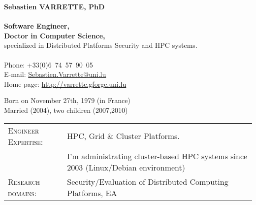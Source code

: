 \documentclass{cv}
\begin{document}
\begin{chapeau}
    \begin{adresse}
        {\Large\textbf{Sebastien VARRETTE, PhD}}\\
        \ligne\\
        \textbf{Software Engineer,}\\
        \textbf{Doctor in Computer Science,}\\
        specialized in Distributed Platforms Security and HPC systems.\\
        \ligne\\
        Phone: +33(0)6~74~57~90~05\\
        E-mail:    \url{Sebastien.Varrette@uni.lu}\\
        Home page: \url{http://varrette.gforge.uni.lu}
    \end{adresse}
    \begin{etatcivil}

        Born on November 27th, 1979 (in France)\\
        Married (2004), two children (2007,2010)\\
    \end{etatcivil}
\end{chapeau}

\vspace{1.6em}
\begin{tabular}{ll}
    \textsc{Engineer Expertise:} & \acf{HPC}, Grid \& Cluster Platforms.
    \\
    & \hfill I'm administrating cluster-based \ac{HPC} systems since 2003
    (Linux/Debian environment)
    \\
    \textsc{Research domains}: & Security/Evaluation of Distributed
    Computing Platforms, \acf{EA}
\end{tabular}












\end{document}
